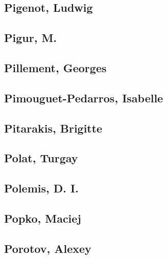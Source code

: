 \subsection[Pigenot, Ludwig (1)]{Pigenot, Ludwig}

\subsection[Pigur, M. (1)]{Pigur, M.}

\subsection[Pillement, Georges (1)]{Pillement, Georges}

\subsection[Pimouguet-Pedarros, Isabelle (1)]{Pimouguet-Pedarros, Isabelle}

\subsection[Pitarakis, Brigitte (1)]{Pitarakis, Brigitte}

\subsection[Polat, Turgay (1)]{Polat, Turgay}

\subsection[Polemis, D. I. (1)]{Polemis, D. I.}

\subsection[Popko, Maciej (1)]{Popko, Maciej}

\subsection[Porotov, Alexey (1)]{Porotov, Alexey}

